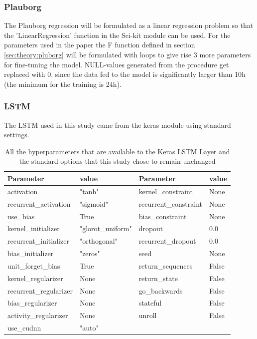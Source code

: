 \subsubsection{Plauborg}

The Plauborg regression will be formulated as a linear regression problem so that the 'LinearRegression' function in the Sci-kit module can be used. For the parameters used in the paper\cite{plauborg_simple_2002} the F function defined in section \ref{sec:theory:pluborg} will be formulated with loops to give rise 3 more parameters for fine-tuning the model. NULL-values generated from the procedure get replaced with 0, since the data fed to the model is significantly larger than 10h (the minimum for the training is 24h).

\subsubsection{LSTM}

The LSTM used in this study came from the keras module using standard settings.

\begin{table}
	\centering
	\begin{tabular}{l|l|l|l}
		Parameter&value&Parameter&value\\\hline
		activation&"tanh"&kernel\_constraint&None\\
		recurrent\_activation&"sigmoid"&recurrent\_constraint&None\\
		use\_bias&True&bias\_constraint&None\\
		kernel\_initializer&"glorot\_uniform"&dropout&0.0\\
		recurrent\_initializer&"orthogonal"&recurrent\_dropout&0.0\\
		bias\_initializer&"zeros"&seed&None\\
		unit\_forget\_bias&True&return\_sequences&False\\
		kernel\_regularizer&None&return\_state&False\\
		recurrent\_regularizer&None&go\_backwards&False\\
		bias\_regularizer&None&stateful&False\\
		activity\_regularizer&None&unroll&False\\
		use\_cudnn&"auto"&&
	\end{tabular}
	\caption[LSTM standard paramters]{All the hyperparameters that are available to the Keras LSTM Layer and the standard options that this study chose to remain unchanged}
	\label{tab:lstm:params}
\end{table}

